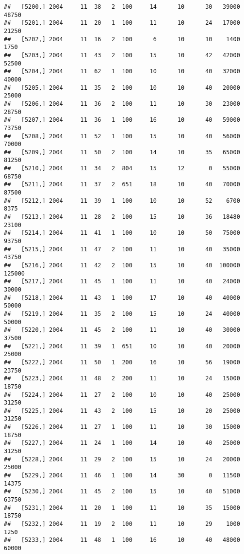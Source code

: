 \documentclass{article}\usepackage[]{graphicx}\usepackage[]{color}
\makeatletter
\newenvironment{kframe}{%
 \def\at@end@of@kframe{}%
 \ifinner\ifhmode%
  \def\at@end@of@kframe{\end{minipage}}%
  \begin{minipage}{\columnwidth}%
 \fi\fi%
 \def\FrameCommand##1{\hskip\@totalleftmargin \hskip-\fboxsep
 \colorbox{shadecolor}{##1}\hskip-\fboxsep
     \hskip-\linewidth \hskip-\@totalleftmargin \hskip\columnwidth}%
 \MakeFramed {\advance\hsize-\width
   \@totalleftmargin\z@ \linewidth\hsize
   \@setminipage}}%
 {\par\unskip\endMakeFramed%
 \at@end@of@kframe}
\newenvironment{knitrout}{}{} %
\makeatother
\begin{document}
\begin{knitrout}
\begin{kframe}
\begin{verbatim}
##   [5200,] 2004     11  38   2  100     14      10      30   39000   48750
##   [5201,] 2004     11  20   1  100     11      10      24   17000   21250
##   [5202,] 2004     11  16   2  100      6      10      10    1400    1750
##   [5203,] 2004     11  43   2  100     15      10      42   42000   52500
##   [5204,] 2004     11  62   1  100     10      10      40   32000   40000
##   [5205,] 2004     11  35   2  100     10      10      40   20000   25000
##   [5206,] 2004     11  36   2  100     11      10      30   23000   28750
##   [5207,] 2004     11  36   1  100     16      10      40   59000   73750
##   [5208,] 2004     11  52   1  100     15      10      40   56000   70000
##   [5209,] 2004     11  50   2  100     14      10      35   65000   81250
##   [5210,] 2004     11  34   2  804     15      12       0   55000   68750
##   [5211,] 2004     11  37   2  651     18      10      40   70000   87500
##   [5212,] 2004     11  39   1  100     10      10      52    6700    8375
##   [5213,] 2004     11  28   2  100     15      10      36   18480   23100
##   [5214,] 2004     11  41   1  100     10      10      50   75000   93750
##   [5215,] 2004     11  47   2  100     11      10      40   35000   43750
##   [5216,] 2004     11  42   2  100     15      10      40  100000  125000
##   [5217,] 2004     11  45   1  100     11      10      40   24000   30000
##   [5218,] 2004     11  43   1  100     17      10      40   40000   50000
##   [5219,] 2004     11  35   2  100     15      10      24   40000   50000
##   [5220,] 2004     11  45   2  100     11      10      40   30000   37500
##   [5221,] 2004     11  39   1  651     10      10      40   20000   25000
##   [5222,] 2004     11  50   1  200     16      10      56   19000   23750
##   [5223,] 2004     11  48   2  200     11      10      24   15000   18750
##   [5224,] 2004     11  27   2  100     10      10      40   25000   31250
##   [5225,] 2004     11  43   2  100     15      10      20   25000   31250
##   [5226,] 2004     11  27   1  100     11      10      30   15000   18750
##   [5227,] 2004     11  24   1  100     14      10      40   25000   31250
##   [5228,] 2004     11  29   2  100     15      10      24   20000   25000
##   [5229,] 2004     11  46   1  100     14      30       0   11500   14375
##   [5230,] 2004     11  45   2  100     15      10      40   51000   63750
##   [5231,] 2004     11  20   1  100     11      10      35   15000   18750
##   [5232,] 2004     11  19   2  100     11      10      29    1000    1250
##   [5233,] 2004     11  48   1  100     16      10      40   48000   60000

\end{verbatim}
\end{kframe}
\end{knitrout}
\end{document}
